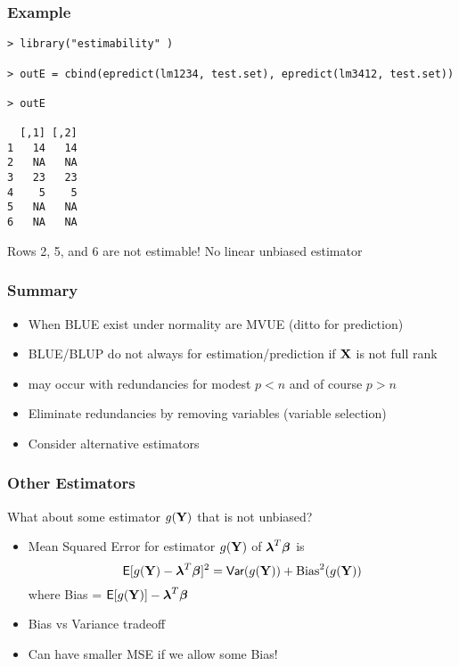 \documentclass[handout]{beamer}
\begin{document}
\begin{frame}[fragile]\frametitle{Example}
\begin{verbatim}
> library("estimability" )

> outE = cbind(epredict(lm1234, test.set), epredict(lm3412, test.set))

> outE

  [,1] [,2]
1   14   14
2   NA   NA
3   23   23
4    5    5
5   NA   NA
6   NA   NA
\end{verbatim}
Rows 2, 5, and 6 are not estimable!  No linear unbiased estimator

  
\end{frame}
\begin{frame} \frametitle{Summary}
  \begin{itemize}
  \item When BLUE exist  under normality are MVUE  (ditto for
    prediction)
 \item BLUE/BLUP do not always for estimation/prediction if $\mathbf{X}$ is not full rank
\item may occur with redundancies for modest $p < n$ and of course $p
  > n$
\item Eliminate redundancies by removing variables (variable
  selection) 
\item Consider alternative estimators
  \end{itemize}
\end{frame}

\begin{frame} \frametitle{Other Estimators}
What about some estimator $g(\mathbf{Y})$ that is not unbiased?
  \begin{itemize}
\item Mean Squared Error for estimator $g(\mathbf{Y})$ of $\boldsymbol{\lambda}^T\boldsymbol{\beta}$ is
$$\textsf{E}[g(\mathbf{Y}) - \boldsymbol{\lambda}^T\boldsymbol{\beta}]^2 = \textsf{Var}(g(\mathbf{Y})) + \text{Bias}^2(g(\mathbf{Y}))$$
where Bias = $\textsf{E}[g(\mathbf{Y})] - \boldsymbol{\lambda}^T\boldsymbol{\beta}$  \pause
\item Bias vs Variance tradeoff \pause
\item Can have smaller MSE if we allow some Bias! 
\end{itemize}
\end{frame}
\end{document}
